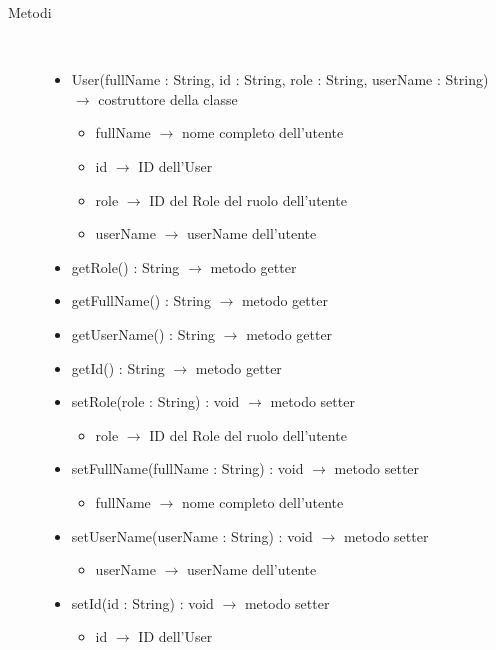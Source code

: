 \begin{description}
\item[Metodi] \hfill \\
\vspace{-7mm}
\begin{itemize}
	\item User(fullName : String, id : String, role : String, userName : String) $\rightarrow$ costruttore della classe\begin{itemize}
		\item fullName $\rightarrow$ nome completo dell'utente
		\item id $\rightarrow$ ID dell'User
		\item role $\rightarrow$ ID del Role del ruolo dell'utente
		\item userName $\rightarrow$ userName dell'utente
	\end{itemize}
	
	\item getRole() : String $\rightarrow$ metodo getter
	\item getFullName() : String $\rightarrow$ metodo getter
	\item getUserName() : String $\rightarrow$ metodo getter
	\item getId() : String $\rightarrow$ metodo getter
	\item setRole(role : String) : void $\rightarrow$ metodo setter\begin{itemize}
		\item role $\rightarrow$ ID del Role del ruolo dell'utente
	\end{itemize}
	
	\item setFullName(fullName : String) : void $\rightarrow$ metodo setter\begin{itemize}
		\item fullName $\rightarrow$ nome completo dell'utente
	\end{itemize}
	
	\item setUserName(userName : String) : void $\rightarrow$ metodo setter\begin{itemize}
		\item userName $\rightarrow$ userName dell'utente
	\end{itemize}
	
	\item setId(id : String) : void $\rightarrow$ metodo setter\begin{itemize}
		\item id $\rightarrow$ ID dell'User
	\end{itemize}
	
\end{itemize}

\end{description}

